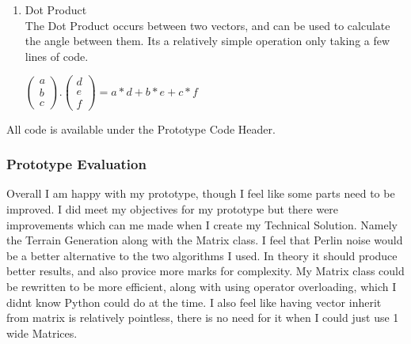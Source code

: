 \begin{flushleft}
\begin{enumerate}
                \item Dot Product \\
                    The Dot Product occurs between two vectors, and can be used to calculate the angle between them. 
                    Its a relatively simple operation only taking a few lines of code.
                    \begin{center}
                        $
                        \begin{pmatrix}
                            a \\
                            b \\
                            c
                        \end{pmatrix} .
                        \begin{pmatrix}
                            d \\
                            e \\
                            f
                        \end{pmatrix} = 
                        a*d + b*e + c*f$
                    \end{center}
            \end{enumerate}

            All code is available under the Prototype Code Header.
            
            \vspace{1cm}
            \subsubsection{Prototype Evaluation}
                \vspace{0.25cm}

                Overall I am happy with my prototype, though I feel like some parts need to be improved. I did meet my 
                objectives for my prototype but there were improvements which can me made when I create my Technical Solution. 
                Namely the Terrain Generation along with the Matrix class. I feel that Perlin noise would be a better alternative
                to the two algorithms I used. In theory it should produce better results, and also provice more marks for 
                complexity. My Matrix class could be rewritten to be more efficient, along with using operator overloading, which
                I didnt know Python could do at the time. I also feel like having vector inherit from matrix is relatively pointless,
                there is no need for it when I could just use 1 wide Matrices.


\end{flushleft}
